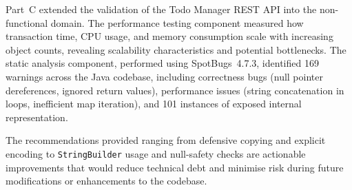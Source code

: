 \documentclass[11pt,a4paper]{article}
\begin{document}
Part~C extended the validation of the Todo Manager REST API into the non-functional domain. The performance testing component measured how transaction time, CPU usage, and memory consumption scale with increasing object counts, revealing scalability characteristics and potential bottlenecks. The static analysis component, performed using SpotBugs~4.7.3, identified 169 warnings across the Java codebase, including correctness bugs (null pointer dereferences, ignored return values), performance issues (string concatenation in loops, inefficient map iteration), and 101 instances of exposed internal representation.

The recommendations provided ranging from defensive copying and explicit encoding to \texttt{StringBuilder} usage and null-safety checks are actionable improvements that would reduce technical debt and minimise risk during future modifications or enhancements to the codebase.
\end{document}

